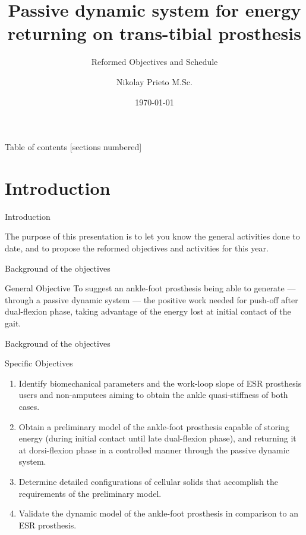 \documentclass[10pt]{beamer}
\title{Passive dynamic system for energy returning on trans-tibial prosthesis}
\subtitle{Reformed Objectives and Schedule}
\date{\today}
\date{}
\author{Nikolay Prieto M.Sc.}
\institute{Universidad Nacional de Colombia}
\begin{document}
\maketitle

\begin{frame}{Table of contents}
  [sections numbered]
  \tableofcontents[hideallsubsections]
\end{frame}

\section{Introduction}

\begin{frame}[fragile]{Introduction}

The purpose of this presentation is to let you know the general activities done to date, and to propose the reformed objectives and activities for this year.

\end{frame}
\begin{frame}[fragile]{Background of the objectives}

\begin{alertblock}{General Objective} 
To suggest an ankle-foot prosthesis being able to generate --- through a passive dynamic system --- the positive work needed for push-off after dual-flexion phase, taking advantage of the energy lost at initial contact of the gait.
\end{alertblock}

\end{frame}

\begin{frame}[fragile]{Background of the objectives}

\begin{alertblock}{Specific Objectives}
\begin{enumerate}

\item Identify biomechanical parameters and the work-loop slope of ESR prosthesis users and non-amputees aiming to obtain the ankle quasi-stiffness of both cases.

\item Obtain a preliminary model of the ankle-foot prosthesis capable of storing energy (during initial contact until late dual-flexion phase), and returning it at dorsi-flexion phase in a controlled manner through the passive dynamic system.

\item Determine detailed configurations of cellular solids that accomplish the requirements of the preliminary model.
\item Validate the dynamic model of the ankle-foot prosthesis in comparison to an ESR prosthesis. \end{enumerate}

\end{alertblock}
\end{frame}
\end{document}
